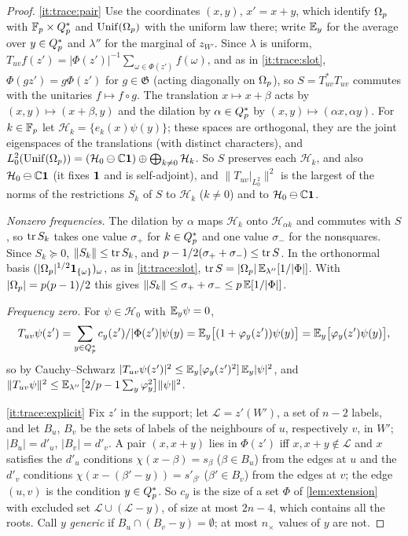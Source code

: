 \begin{proof}
\ref{it:trace:pair} Use the coordinates $(x,y)$, $x'=x+y$, which identify $\Omega_{p}$
with $\mathbb F_p\times Q_{p}^{*}$ and $\operatorname{Unif}(\Omega_{p})$ with the uniform law there; write
$\mathbb E_y$ for the average over $y\in Q_{p}^{*}$ and $\lambda''$ for the marginal of $z_{W'}$.
Since $\lambda$ is uniform, $T_{uv}f(z')=|\Phi(z')|^{-1}\sum_{\omega\in\Phi(z')}f(\omega)$, and
as in \ref{it:trace:slot}, $\Phi(gz')=g\Phi(z')$ for $g\in\mathfrak G$ (acting diagonally
on $\Omega_{p}$), so $S=T_{uv}^*T_{uv}$ commutes with the unitaries $f\mapsto f\circ g$. The
translation $x\mapsto x+\beta$ acts by $(x,y)\mapsto(x+\beta,y)$ and the dilation by
$\alpha\in Q_{p}^{*}$ by $(x,y)\mapsto(\alpha x,\alpha y)$. For $k\in\mathbb F_p$ let
$\mathcal H_k=\{e_k(x)\psi(y)\}$; these spaces are orthogonal, they are the joint
eigenspaces of the translations (with distinct characters), and
$L^2_0(\operatorname{Unif}(\Omega_{p}))=(\mathcal H_0\ominus\mathbb C\mathbf 1)\oplus\bigoplus_{k\ne0}\mathcal H_k$. So $S$
preserves each $\mathcal H_k$, and also $\mathcal H_0\ominus\mathbb C\mathbf 1$ (it fixes $\mathbf 1$
and is self-adjoint), and $\|T_{uv}|_{L^2_0}\|^2$ is the largest of the norms of
the restrictions $S_k$ of $S$ to $\mathcal H_k$ ($k\ne0$) and to
$\mathcal H_0\ominus\mathbb C\mathbf 1$.

\emph{Nonzero frequencies.} The dilation by $\alpha$ maps $\mathcal H_k$ onto
$\mathcal H_{\alpha k}$ and commutes with $S$, so $\operatorname{tr} S_k$ takes one value
$\sigma_+$ for $k\in Q_{p}^{*}$ and one value $\sigma_-$ for the nonsquares. Since
$S_k\succeq0$, $\|S_k\|\le\operatorname{tr} S_k$, and
$p-1/2(\sigma_++\sigma_-)\le\operatorname{tr} S$. In the orthonormal basis
$(|\Omega_{p}|^{1/2}\mathbf 1_{\{\omega\}})_\omega$, as in \ref{it:trace:slot},
$\operatorname{tr} S=|\Omega_{p}|\,\mathbb E_{\lambda''}[1/|\Phi|]$. With $|\Omega_{p}|=p(p-1)/2$ this gives
$\|S_k\|\le\sigma_++\sigma_-\le p\,\mathbb E[1/|\Phi|]$.

\emph{Frequency zero.} For $\psi\in\mathcal H_0$ with $\mathbb E_y\psi=0$,
\[
 T_{uv}\psi(z')=\sum_{y\in Q_{p}^{*}}c_y(z')/|\Phi(z')|\psi(y)
 =\mathbb E_y\bigl[(1+\varphi_y(z'))\psi(y)\bigr]=\mathbb E_y\bigl[\varphi_y(z')\psi(y)\bigr],
\]
so by Cauchy--Schwarz
$|T_{uv}\psi(z')|^2\le\mathbb E_y[\varphi_y(z')^2]\,\mathbb E_y|\psi|^2$, and
$\|T_{uv}\psi\|^2\le\mathbb E_{\lambda''}\bigl[2/p-1\sum_y\varphi_y^2\bigr]\|\psi\|^2$.

\ref{it:trace:explicit} Fix $z'$ in the support; let $\mathcal L=z'(W')$, a set of $n-2$
labels, and let $B_u$, $B_v$ be the sets of labels of the neighbours of $u$,
respectively $v$, in $W'$; $|B_u|=d'_u$, $|B_v|=d'_v$. A pair $(x,x+y)$ lies in
$\Phi(z')$ iff $x,x+y\notin\mathcal L$ and $x$ satisfies the $d'_u$ conditions
$\chi(x-\beta)=s_\beta$ ($\beta\in B_u$) from the edges at $u$ and the $d'_v$
conditions $\chi(x-(\beta'-y))=s'_{\beta'}$ ($\beta'\in B_v$) from the edges at $v$; the
edge $(u,v)$ is the condition $y\in Q_{p}^{*}$. So $c_y$ is the size of a set $\Phi$ of
\cref{lem:extension} with excluded set $\mathcal L\cup(\mathcal L-y)$, of size at most $2n-4$,
which contains all the roots. Call $y$ \emph{generic} if
$B_u\cap(B_v-y)=\emptyset$; at most $n_\times$ values of $y$ are not.


\end{proof}
